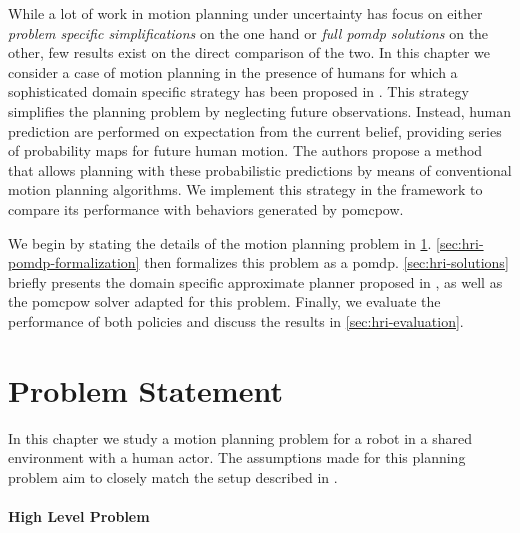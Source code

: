 While a lot of work in motion planning under uncertainty has focus on either
\emph{problem specific simplifications} on the one hand or \emph{full
\ac{pomdp} solutions} on the other, few results exist on the direct comparison
of the two. In this chapter we consider a case of motion planning in the
presence of humans for which a sophisticated domain specific strategy has been
proposed in \cite{fisac2018probabilistically}. This strategy simplifies the
planning problem by neglecting future observations. Instead, human prediction
are performed on expectation from the current belief, providing series of
probability maps for future human motion. The authors propose a method that
allows planning with these probabilistic predictions by means of conventional
motion planning algorithms. We implement this strategy in the \pomdpsjl
framework to compare its performance with behaviors generated by
\ac{pomcpow}.

We begin by stating the details of the motion planning problem in
\cref{sec:hri-problem-statement}. \cref{sec:hri-pomdp-formalization} then
formalizes this problem as a \ac{pomdp}. \cref{sec:hri-solutions} briefly
presents the domain specific approximate planner proposed in
\cite{fisac2018probabilistically}, as well as the \ac{pomcpow} solver adapted
for this problem. Finally, we evaluate the performance of both policies and
discuss the results in \cref{sec:hri-evaluation}.

\section{Problem Statement}\label{sec:hri-problem-statement}

In this chapter we study a motion planning problem for a robot in a shared
environment with a human actor. The assumptions made for this planning problem
aim to closely match the setup described in \cite{fisac2018probabilistically}.


\paragraph{High Level Problem}

